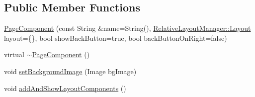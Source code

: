 \subsection*{Public Member Functions}
\begin{DoxyCompactItemize}
\item 
\mbox{\hyperlink{classPageComponent_aa3fec95406141cea5175afc08b93a3c2}{Page\+Component}} (const String \&name=String(), \mbox{\hyperlink{classRelativeLayoutManager_a3dcd4cd0bc41754f3b4a64bc29b5eca5}{Relative\+Layout\+Manager\+::\+Layout}} layout=\{\}, bool show\+Back\+Button=true, bool back\+Button\+On\+Right=false)
\item 
virtual \mbox{\hyperlink{classPageComponent_a911e85b5c24e9716e5aabf46eb264ffd}{$\sim$\+Page\+Component}} ()
\item 
void \mbox{\hyperlink{classPageComponent_a8928cfec4b20fdb541ec1cf20cf0c194}{set\+Background\+Image}} (Image bg\+Image)
\item 
void \mbox{\hyperlink{classPageComponent_a5a0e41cc4ed37234cc4eb19c84910a94}{add\+And\+Show\+Layout\+Components}} ()
\end{DoxyCompactItemize}
